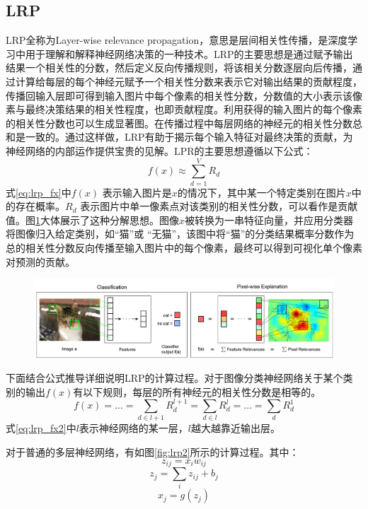 \subsection{LRP}
LRP全称为Layer-wise relevance propagation，意思是层间相关性传播，是深度学习中用于理解和解释神经网络决策的一种技术。LRP的主要思想是通过赋予输出结果一个相关性的分数，然后定义反向传播规则，将该相关分数逐层向后传播，通过计算给每层的每个神经元赋予一个相关性分数来表示它对输出结果的贡献程度，传播回输入层即可得到输入图片中每个像素的相关性分数，分数值的大小表示该像素与最终决策结果的相关性程度，也即贡献程度。利用获得的输入图片的每个像素的相关性分数也可以生成显著图。在传播过程中每层网络的神经元的相关性分数总和是一致的。通过这样做，LRP有助于揭示每个输入特征对最终决策的贡献，为神经网络的内部运作提供宝贵的见解。LPR的主要思想遵循以下公式：
\begin{equation}
	f(x)\approx \sum_{d=1}^{V} R_d
	\label{eq:lrp_fx}
\end{equation}
式\ref{eq:lrp_fx}中$f(x)$ 表示输入图片是$x$的情况下，其中某一个特定类别在图片$x$中的存在概率。$R_d$ 表示图片中单一像素点对该类别的相关性分数，可以看作是贡献值。图\ref{fig:lrp1}大体展示了这种分解思想。图像$x$被转换为一串特征向量，并应用分类器将图像归入给定类别，如“猫”或 “无猫”，该图中将“猫”的分类结果概率分数作为总的相关性分数反向传播至输入图片中的每个像素，最终可以得到可视化单个像素对预测的贡献。
\begin{figure}[h]
	\centering 
	\includegraphics[width=15cm]{fig/ch2/lrp1.png}
	\label{fig:lrp1}
\end{figure}

下面结合公式推导详细说明LRP的计算过程。对于图像分类神经网络关于某个类别的输出$f(x)$有以下规则，每层的所有神经元的相关性分数是相等的。
\begin{equation}
	f(x)=\ldots=\sum_{d \in l+1} R_{d}^{l+1}=\sum_{d \in l} R_{d}^{l}=\ldots=\sum_{d} R_{d}^{1}
	\label{eq:lrp_fx2}
\end{equation}
式\ref{eq:lrp_fx2}中$l$表示神经网络的某一层，$l$越大越靠近输出层。

对于普通的多层神经网络，有如图\ref{fig:lrp2}所示的计算过程。其中：
\begin{equation}
	z_{ij}=x_iw_{ij}
	\label{eq:lrp_zij}
\end{equation}
\begin{equation}
	z_{j}=\sum_i z_{ij}+b_j
	\label{eq:lrp_zj}
\end{equation}
\begin{equation}
	x_j=g(z_{j})
	\label{eq:lrp_xj}
\end{equation}

